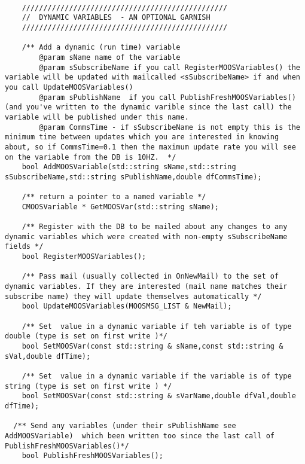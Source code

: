 \documentclass[a4paper,10pt]{article}
\begin{document}
\begin{lstlisting}

    ////////////////////////////////////////////////
    //  DYNAMIC VARIABLES  - AN OPTIONAL GARNISH
    ////////////////////////////////////////////////

    /** Add a dynamic (run time) variable
        @param sName name of the variable
        @param sSubscribeName if you call RegisterMOOSVariables() the variable will be updated with mailcalled <sSubscribeName> if and when you call UpdateMOOSVariables()
        @param sPublishName  if you call PublishFreshMOOSVariables() (and you've written to the dynamic varible since the last call) the variable will be published under this name.
        @param CommsTime - if sSubscribeName is not empty this is the minimum time between updates which you are interested in knowing about, so if CommsTime=0.1 then the maximum update rate you will see on the variable from the DB is 10HZ.  */
    bool AddMOOSVariable(std::string sName,std::string sSubscribeName,std::string sPublishName,double dfCommsTime);

    /** return a pointer to a named variable */
    CMOOSVariable * GetMOOSVar(std::string sName);

    /** Register with the DB to be mailed about any changes to any dynamic variables which were created with non-empty sSubscribeName fields */
    bool RegisterMOOSVariables();
	
    /** Pass mail (usually collected in OnNewMail) to the set of dynamic variables. If they are interested (mail name matches their subscribe name) they will update themselves automatically */
    bool UpdateMOOSVariables(MOOSMSG_LIST & NewMail);

    /** Set  value in a dynamic variable if teh variable is of type double (type is set on first write )*/
    bool SetMOOSVar(const std::string & sName,const std::string & sVal,double dfTime);

    /** Set  value in a dynamic variable if the variable is of type string (type is set on first write ) */
    bool SetMOOSVar(const std::string & sVarName,double dfVal,double dfTime);

  /** Send any variables (under their sPublishName see AddMOOSVariable)  which been written too since the last call of PublishFreshMOOSVariables()*/
    bool PublishFreshMOOSVariables();
\end{lstlisting}
\end{document}
